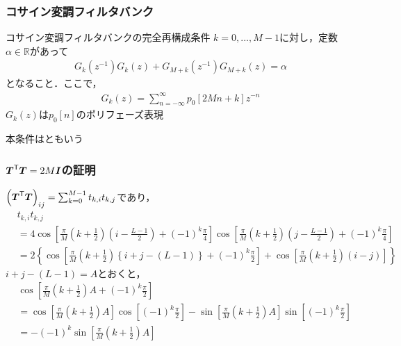 \documentclass[14pt,xcolor=dvipsnames,table,dvipdfmx]{beamer}
\begin{document}
\begin{frame}[c]
    \frametitle{コサイン変調フィルタバンク}
    \begin{block}{コサイン変調フィルタバンクの完全再構成条件}
        $k = 0, ..., M-1$に対し，定数$\alpha \in \mathbb{R}$があって
        \begin{align}
            G_{k}(z^{-1}) G_{k}(z) + G_{M + k}(z^{-1}) G_{M + k}(z) = \alpha
        \end{align}
        となること．ここで，
        \begin{align}
            G_{k}(z) = \sum_{n = -\infty}^{\infty} p_{0}[2Mn + k] z^{-n} \label{eq:polyphase_representation_of_prototype}
        \end{align}
        $G_{k}(z)$は$p_{0}[n]$のポリフェーズ表現
    \end{block}
    本条件はともいう
\end{frame}

\begin{frame}[c]
    \frametitle{$\boldsymbol{T}^{\mathsf{T}} \boldsymbol{T} = 2M\boldsymbol{I}$の証明}
    $\left( \boldsymbol{T}^{\mathsf{T}} \boldsymbol{T} \right)_{ij} = \sum_{k = 0}^{M - 1} t_{k,i} t_{k,j}$であり，
    \scriptsize
    \begin{align*}
        & t_{k,i} t_{k,j} \\
        &= 4 \cos\left[ \frac{\pi}{M} \left( k + \frac{1}{2} \right) \left( i - \frac{L - 1}{2} \right) + (-1)^{k}\frac{\pi}{4} \right] \cos\left[ \frac{\pi}{M} \left( k + \frac{1}{2} \right) \left( j - \frac{L - 1}{2} \right) + (-1)^{k}\frac{\pi}{4} \right] \\
        &= 2 \left\{ \cos\left[ \frac{\pi}{M} \left( k + \frac{1}{2} \right) \left\{ i + j - (L - 1) \right\} + (-1)^{k} \frac{\pi}{2} \right] + \cos\left[ \frac{\pi}{M} \left( k + \frac{1}{2} \right) \left( i - j \right) \right] \right\}
    \end{align*}
    \normalsize
    $i + j - (L - 1) = A$とおくと，
    \scriptsize
    \begin{align*}
        & \cos\left[ \frac{\pi}{M} \left( k + \frac{1}{2} \right)A + (-1)^{k}\frac{\pi}{2} \right] \\
        &= \cos\left[ \frac{\pi}{M} \left( k + \frac{1}{2} \right)A \right] \cos\left[(-1)^{k}\frac{\pi}{2} \right] - \sin\left[ \frac{\pi}{M} \left( k + \frac{1}{2} \right)A \right] \sin\left[(-1)^{k}\frac{\pi}{2} \right] \\
        &= -(-1)^{k} \sin \left[ \frac{\pi}{M} \left( k + \frac{1}{2} \right)A \right]
    \end{align*}
\end{frame}
\end{document}

